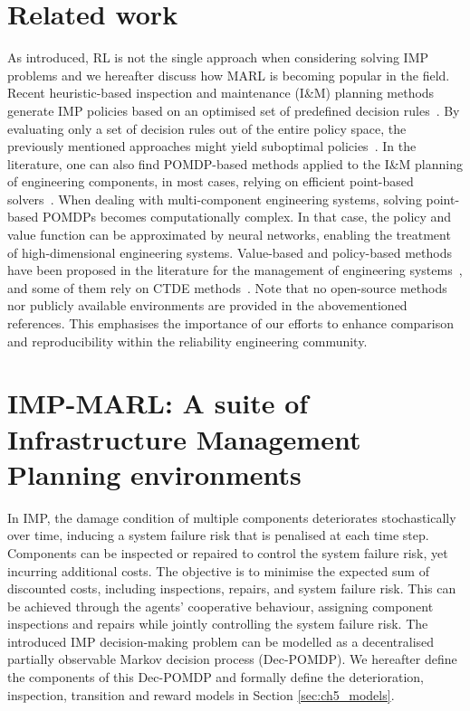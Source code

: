 \section{Related work} \label{sec:ch5_relatedwork}
As introduced, RL is not the single approach when considering solving IMP problems and we hereafter discuss how MARL is becoming popular in the field.
Recent heuristic-based inspection and maintenance (I\&M) planning methods generate IMP policies based on an optimised set of predefined decision rules~\citep{LuqueDBN2019, Bismut2019OptimalDete}.
By evaluating only a set of decision rules out of the entire policy space, the previously mentioned approaches might yield suboptimal policies~\citep{morato2022optimal}.
In the literature, one can also find POMDP-based methods applied to the I\&M planning of engineering components, in most cases, relying on efficient point-based solvers~\citep{Papakonstantinou2014Part1, Papakonstantinou2014Part2, morato2022optimal}. 
When dealing with multi-component engineering systems, solving point-based POMDPs becomes computationally complex.
In that case, the policy and value function can be approximated by neural networks, enabling the treatment of high-dimensional engineering systems.
Value-based and policy-based methods have been proposed in the literature for the management of engineering systems~\citep{Andriotis2019ManagingLearning,andriotis2021deep,morato2022syst}, and some of them rely on CTDE methods~\citep{nguyen2022weighted, saifullah2022deep}.
Note that no open-source methods nor publicly available environments are provided in the abovementioned references.
This emphasises the importance of our efforts to enhance comparison and reproducibility within the reliability engineering community.

\section{IMP-MARL: A suite of Infrastructure Management Planning environments} \label{sec:ch5_imp}

In IMP, the damage condition of multiple components deteriorates stochastically over time, inducing a system failure risk that is penalised at each time step.
Components can be inspected or repaired to control the system failure risk, yet incurring additional costs.
The objective is to minimise the expected sum of discounted costs, including inspections, repairs, and system failure risk.
This can be achieved through the agents' cooperative behaviour, assigning component inspections and repairs while jointly controlling the system failure risk.
The introduced IMP decision-making problem can be modelled as a decentralised partially observable Markov decision process (Dec-POMDP).
We hereafter define the components of this Dec-POMDP and formally define the deterioration, inspection, transition and reward models in Section \ref{sec:ch5_models}.

